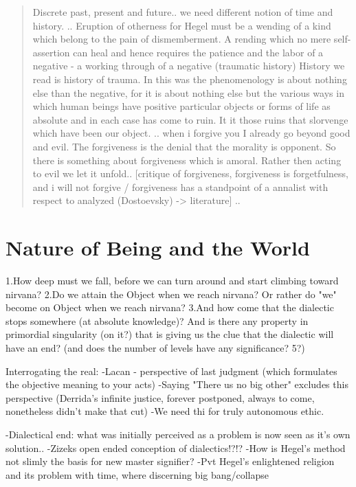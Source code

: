 \documentclass{book}
\begin{document}
\begin{quotation}
Discrete past, present and future.. we need different notion of time and history. .. Eruption of otherness for Hegel must be a wending of a kind which belong to the pain of dismemberment. A rending which no mere self-assertion can heal and hence requires the patience and the labor of a negative - a working through of a negative (traumatic history) History we read is history of trauma. In this was the phenomenology is about nothing else than the negative, for it is about nothing else but the various ways in which human beings have positive particular objects or forms of life as absolute and in each case has come to ruin. It it those ruins that slorvenge which have been our object. .. when i forgive you I already go beyond good and evil. The forgiveness is the denial that the morality is opponent. So there is something about forgiveness which is amoral. Rather then acting to evil we let it unfold.. [critique of forgiveness, forgiveness is forgetfulness, and i will not forgive / forgiveness has a standpoint of a annalist with respect to analyzed (Dostoevsky) -> literature] ..
\end{quotation}
\chapter {Nature of Being and the World}

1.How deep must we fall, before we can turn around and start climbing toward nirvana?
2.Do we attain the Object when we reach nirvana? Or rather do "we" become on Object when we reach nirvana?
3.And how come that the dialectic stops somewhere (at absolute knowledge)? And is there any property in primordial singularity (on it?) that is giving us the clue that the dialectic will have an end? (and does the number of levels have any significance? 5?)

Interrogating the real:
-Lacan - perspective of last judgment (which formulates the objective meaning to your acts)
-Saying "There us no big other" excludes this perspective (Derrida's infinite justice, forever postponed, always to come, nonetheless didn't make that cut)
-We need thi for truly autonomous ethic.

-Dialectical end: what was initially perceived as a problem is now seen as it's own solution..
-Zizeks open ended conception of dialectics!?!?
-How is Hegel's method not slimly the basis for new master signifier?
-Pvt Hegel's enlightened religion and its problem with time, where discerning big bang/collapse
\end{document}
